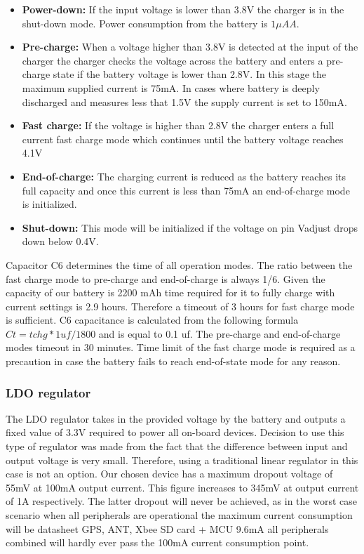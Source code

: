 \begin{itemize}
\item \textbf{Power-down:} If the input voltage is lower than 3.8V the charger is in the shut-down mode. Power consumption from the battery is $1\mu A A$.
\item \textbf{Pre-charge:} When a voltage higher than 3.8V is detected at the input of the charger the charger checks the voltage across the battery and enters a pre-charge state if the battery voltage is lower than 2.8V. In this stage the maximum supplied current is 75mA. In cases where battery is deeply discharged and measures less that 1.5V the supply current is set to 150mA. 
\item \textbf{Fast charge:} If the voltage is higher than 2.8V the charger enters a full current fast charge mode which continues until the battery voltage reaches 4.1V 
\item \textbf{End-of-charge:} The charging current is reduced as the battery reaches its full capacity and once this current is less than 75mA an end-of-charge mode is initialized. 
\item \textbf{Shut-down:} This mode will be initialized if the voltage on pin Vadjust drops down below 0.4V.
\end{itemize}

Capacitor C6 determines the time of all operation modes. The ratio between the fast charge mode to pre-charge and end-of-charge is always 1/6. Given the capacity of our battery is 2200 mAh time required for it to fully charge with current settings is 2.9 hours. Therefore a timeout of 3 hours for fast charge mode is sufficient. C6 capacitance is calculated from the following formula $Ct = tchg *  1uf / 1800$ and is equal to 0.1 uf. The pre-charge and end-of-charge modes timeout in 30 minutes. Time limit of the fast charge mode is required as a precaution in case the battery fails to reach end-of-state mode for any reason.


\subsubsection{LDO regulator}
The LDO regulator takes in the provided voltage by the battery and outputs a fixed value of 3.3V required to power all on-board devices. Decision to use this type of regulator was made from the fact that the difference between input and output voltage is very small. Therefore, using a traditional linear regulator in this case is not an option. Our chosen device has a maximum dropout voltage of 55mV at 100mA output current. This figure increases to 345mV at output current of 1A respectively. The latter dropout will never be achieved, as in the worst case scenario when all peripherals are operational the maximum current consumption will be  datasheet GPS, ANT, Xbee SD card + MCU 9.6mA
 all peripherals combined will hardly ever pass the 100mA current consumption point.
 
